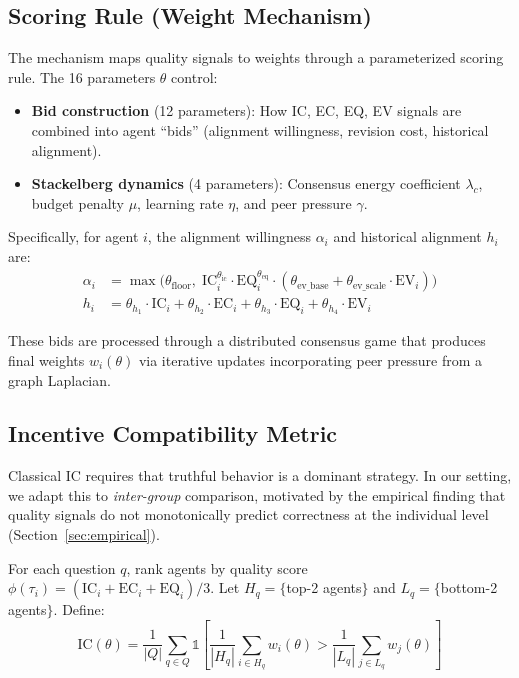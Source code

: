 \documentclass[runningheads]{llncs}
\begin{document}
\subsection{Scoring Rule (Weight Mechanism)}
\label{sec:scoring}

The mechanism maps quality signals to weights through a parameterized scoring rule. The 16 parameters $\theta$ control:

\begin{itemize}
    \item \textbf{Bid construction} (12 parameters): How IC, EC, EQ, EV signals are combined into agent ``bids'' (alignment willingness, revision cost, historical alignment).
    \item \textbf{Stackelberg dynamics} (4 parameters): Consensus energy coefficient $\lambda_c$, budget penalty $\mu$, learning rate $\eta$, and peer pressure $\gamma$.
\end{itemize}

Specifically, for agent $i$, the alignment willingness $\alpha_i$ and historical alignment $h_i$ are:
\begin{align}
    \alpha_i &= \max\!\big(\theta_{\text{floor}}, \; \text{IC}_i^{\theta_{\text{ic}}} \cdot \text{EQ}_i^{\theta_{\text{eq}}} \cdot (\theta_{\text{ev\_base}} + \theta_{\text{ev\_scale}} \cdot \text{EV}_i)\big) \\
    h_i &= \theta_{h_1} \cdot \text{IC}_i + \theta_{h_2} \cdot \text{EC}_i + \theta_{h_3} \cdot \text{EQ}_i + \theta_{h_4} \cdot \text{EV}_i
\end{align}

These bids are processed through a distributed consensus game that produces final weights $w_i(\theta)$ via iterative updates incorporating peer pressure from a graph Laplacian.

\subsection{Incentive Compatibility Metric}
\label{sec:ic_metric}

Classical IC requires that truthful behavior is a dominant strategy. In our setting, we adapt this to \emph{inter-group} comparison, motivated by the empirical finding that quality signals do not monotonically predict correctness at the individual level (Section~\ref{sec:empirical}).

\begin{definition}
For each question $q$, rank agents by quality score $\phi(\tau_i) = (\text{IC}_i + \text{EC}_i + \text{EQ}_i)/3$. Let $H_q = \{$top-2 agents$\}$ and $L_q = \{$bottom-2 agents$\}$. Define:
\begin{equation}
    \text{IC}(\theta) = \frac{1}{|Q|} \sum_{q \in Q} \mathbb{1}\!\left[\frac{1}{|H_q|}\sum_{i \in H_q} w_i(\theta) > \frac{1}{|L_q|}\sum_{j \in L_q} w_j(\theta)\right]
    \label{eq:ic_metric}
\end{equation}
\end{definition}
\end{document}

